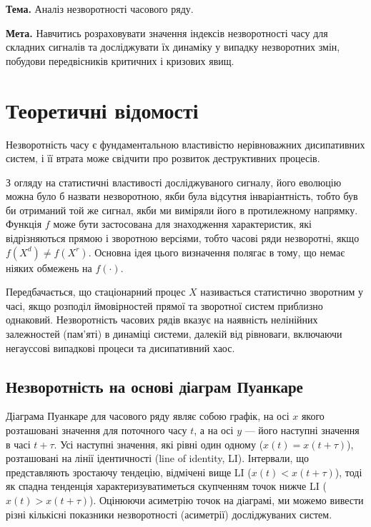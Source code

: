 \documentclass[
  letterpaper,
]{report}
\begin{document}
\textbf{Тема.} Аналіз незворотності часового ряду.

\textbf{Мета.} Навчитись розраховувати значення індексів незворотності
часу для складних сигналів та досліджувати їх динаміку у випадку
незворотних змін, побудови передвісників критичних і кризових явищ.

\hypertarget{ux442ux435ux43eux440ux435ux442ux438ux447ux43dux456-ux432ux456ux434ux43eux43cux43eux441ux442ux456-7}{%
\section{Теоретичні
відомості}\label{ux442ux435ux43eux440ux435ux442ux438ux447ux43dux456-ux432ux456ux434ux43eux43cux43eux441ux442ux456-7}}

Незворотність часу є фундаментальною властивістю нерівноважних
дисипативних систем, і її втрата може свідчити про розвиток
деструктивних процесів.

З огляду на статистичні властивості досліджуваного сигналу, його
еволюцію можна було б назвати незворотною, якби була відсутня
інваріантність, тобто був би отриманий той же сигнал, якби ми виміряли
його в протилежному напрямку. Функція \(f\) може бути застосована для
знаходження характеристик, які відрізняються прямою і зворотною
версіями, тобто часові ряди незворотні, якщо \(f(X^d) \neq f(X^r)\).
Основна ідея цього визначення полягає в тому, що немає ніяких обмежень
на \(f(\cdot )\).

Передбачається, що стаціонарний процес \(X\) називається статистично
зворотним у часі, якщо розподіл ймовірностей прямої та зворотної систем
приблизно однаковий. Незворотність часових рядів вказує на наявність
нелінійних залежностей (пам'яті) в динаміці системи, далекій від
рівноваги, включаючи негауссові випадкові процеси та дисипативний хаос.

\hypertarget{ux43dux435ux437ux432ux43eux440ux43eux442ux43dux456ux441ux442ux44c-ux43dux430-ux43eux441ux43dux43eux432ux456-ux434ux456ux430ux433ux440ux430ux43c-ux43fux443ux430ux43dux43aux430ux440ux435}{%
\subsection{Незворотність на основі діаграм
Пуанкаре}\label{ux43dux435ux437ux432ux43eux440ux43eux442ux43dux456ux441ux442ux44c-ux43dux430-ux43eux441ux43dux43eux432ux456-ux434ux456ux430ux433ux440ux430ux43c-ux43fux443ux430ux43dux43aux430ux440ux435}}

Діаграма Пуанкаре для часового ряду являє собою графік, на осі \(x\)
якого розташовані значення для поточного часу \(t\), а на осі \(y\) ---
його наступні значення в часі \(t+\tau\). Усі наступні значення, які
рівні один одному (\(x(t) = x(t+\tau)\)), розташовані на лінії
ідентичності (line of identity, LI). Інтервали, що представляють
зростаючу тендецію, відмічені вище LI (\(x(t)<x(t+\tau)\)), тоді як
спадна тенденція характеризуватиметься скупченням точок нижче LI
(\(x(t)>x(t+\tau)\)). Оцінюючи асиметрію точок на діаграмі, ми можемо
вивести різні кількісні показники незворотності (асиметрії)
досліджуваних систем.
\end{document}
